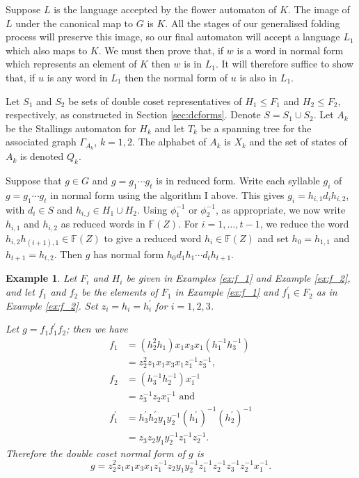\documentclass[a4paper,12pt]{article}
\newcommand{\G}{\Gamma }
\newtheorem{exam}[theorem]{Example}
\newenvironment{example}{\begin{exam} \rm}{\end{exam}}
\numberwithin{equation}{section}
\numberwithin{figure}{section}
\newcommand{\FF}{\ensuremath{\mathbb{F}}}
\begin{document}
 Suppose $L$ is the
language accepted by the flower automaton of $K$. The image of $L$ under
the canonical map to $G$ is $K$. All the stages of our generalised folding
process will preserve this image, so our final automaton will accept a language
$L_1$ which also maps to $K$. We must then prove that, if $w$ is a word
in normal form which represents an element of $K$ then $w$ is in $L_1$. It will
therefore suffice to show that, if $u$ is any word in $L_1$ then the
normal form of $u$ is also in $L_1$.

Let $S_1$ and $S_2$ be sets of double coset representatives of 
$H_1\le F_1$ and $H_2\le F_2$, respectively, as constructed in Section 
\ref{sec:dcforms}. 
Denote $S= S_1 \cup S_2$. Let $A_k$ be the
Stallings automaton for $H_k$ and let $T_k$ be a spanning tree for
the associated graph $\G_{A_k}$, $k=1,2$. The alphabet of $A_k$ is
$X_k$ and the set of states of $A_k$ is denoted $Q_k$.

Suppose that $g \in G$ and $g=g_1\cdots g_t$ is in reduced form.
Write each syllable $g_i$ of $g=g_1\cdots g_t$ in normal form
using the algorithm I above. This gives
$g_i=h_{i,1}d_ih_{i,2}$, with $d_i\in S$ and $h_{i,j}\in H_1\cup
H_2$. Using $\phi_1^{-1}$ or $\phi_2^{-1}$, as appropriate, we now
write $h_{i,1}$ and $h_{i,2}$ as reduced words in $\FF(Z)$. For
$i=1,\ldots , t-1$, we reduce the word $h_{i,2}h_{(i+1),1}\in
\FF(Z)$ to give a reduced word $h_i\in \FF(Z)$ and set $h_0=h_{1,1}$
and  $h_{t+1}=h_{t,2}$. Then $g$ has normal form $h_0d_1h_1\cdots
d_th_{t+1}$.


\begin{example}\label{ex:g}
Let $F_i$ and $H_i$ be given in Examples \ref{ex:f_1} and  
Example \ref{ex:f_2}, and  
let $f_1$ and $f_2$ be the elements of $F_1$ in Example \ref{ex:f_1} and 
$f_1^\prime\in F_2$ as in Example \ref{ex:f_2}. 
Set $z_i = h_i = h_i^{\prime}$ for $i= 1,2,3$. 

Let $g =f_1 f_1^\prime f_2$; then we have 
\begin{align*}
f_1&=(h_2^{2}h_1) x_1x_3x_1 (h_1^{-1}h_3^{-1})\\
&=z_2^2z_1  x_1x_3x_1z_1^{-1}z_3^{-1},\\
f_2&=(h_3^{-1}h_2^{-1}) x_1^{-1}\\
&=z_3^{-1}z_2 x_1^{-1}\textrm{ and }\\
f_1^\prime&=h^\prime_3h_2^\prime y_1y_2^{-1} (h_1^\prime)^{-1}(h_2^\prime)^{-1}\\
&= z_3z_2 y_1y_2^{-1} z_1^{-1}z_2^{-1}.
\end{align*}
Therefore the double coset normal form of $g$ is 
\[g=z_2^2 z_1  x_1 x_3 x_1 z_1^{-1} 
z_2y_1y_2^{-1} z_1^{-1}z_2^{-1}
z_3^{-1}z_2^{-1} x_1^{-1}.
\]
\end{example}
\end{document}
